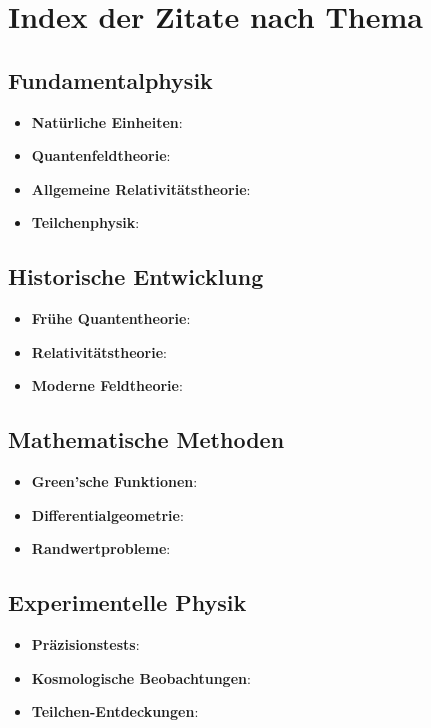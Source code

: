 \documentclass[12pt,a4paper]{article}
\begin{document}
	\section*{Index der Zitate nach Thema}
	\label{app:citation_index}
	
	\subsection*{Fundamentalphysik}
	\begin{itemize}
		\item \textbf{Natürliche Einheiten}: \citet{planck1900,planck1906,weinberg1995,peskin1995}
		\item \textbf{Quantenfeldtheorie}: \citet{weinberg1995,peskin1995,srednicki2007,zee2010}
		\item \textbf{Allgemeine Relativitätstheorie}: \citet{einstein1915,misner1973,carroll2004,wald1984}
		\item \textbf{Teilchenphysik}: \citet{griffiths2008,perkins2000,weinberg2003}
	\end{itemize}
	
	\subsection*{Historische Entwicklung}
	\begin{itemize}
		\item \textbf{Frühe Quantentheorie}: \citet{planck1900,bohr1913,heisenberg1927,debroglie1924}
		\item \textbf{Relativitätstheorie}: \citet{einstein1905,einstein1915,schwarzschild1916}
		\item \textbf{Moderne Feldtheorie}: \citet{weinberg1967,salam1968,higgs1964,englert1964}
	\end{itemize}
	
	\subsection*{Mathematische Methoden}
	\begin{itemize}
		\item \textbf{Green'sche Funktionen}: \citet{jackson1998,duffy2001,roach1982}
		\item \textbf{Differentialgeometrie}: \citet{misner1973,abraham1988}
		\item \textbf{Randwertprobleme}: \citet{stakgold1998,haberman2004}
	\end{itemize}
	
	\subsection*{Experimentelle Physik}
	\begin{itemize}
		\item \textbf{Präzisionstests}: \citet{will2014,adelberger2003,murphy2003}
		\item \textbf{Kosmologische Beobachtungen}: \citet{planck2020,weinberg2008}
		\item \textbf{Teilchen-Entdeckungen}: \citet{aad2012,chatrchyan2012,abbott2017}
	\end{itemize}
	
	
\end{document}
